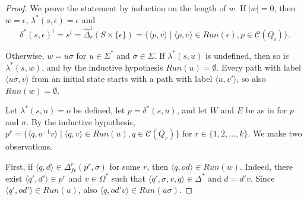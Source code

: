 \begin{proof}
  We prove the statement by induction on the length of $w$. If $|w| = 0$, then $w =
  \epsilon$, $\lambda^*(s, \epsilon) = \epsilon$ and
  \begin{equation*}
    \delta^*(s, \epsilon)^i = s^i = \hat{\Delta}_\epsilon^i(S \times \{ \epsilon \}) =
    \{ \langle p, v \rangle \mid \langle p, v \rangle \in Run(\epsilon), p \in
    \mathcal{C}(Q_i) \}.
  \end{equation*}

  Otherwise, $w = u\sigma$ for $u \in \Sigma^*$ and $\sigma \in \Sigma$. If
  $\lambda^*(s, u)$ is undefined, then so is $\lambda^*(s, w)$, and by the inductive
  hypothesis $Run(u) = \emptyset$. Every path with label $\langle u\sigma, v
  \rangle$ from an initial state starts with a path with label $\langle u, v'
  \rangle$, so also $Run(w) = \emptyset$.

  Let $\lambda^*(s, u) = o$ be defined, let $p = \delta^*(s, u)$, and let $W$ and $E$
  be as in  for $p$ and $\sigma$. By the inductive
  hypothesis, $p^r = \{ \langle q, o^{-1}v \rangle \mid \langle q, v \rangle \in
  Run(u), q \in \mathcal{C}(Q_r) \}$ for $r \in \{ 1, 2, \ldots, k \}$. We make two
  observations.

  First, if $\langle q, d \rangle \in \Delta_{f\epsilon}^r(p^r, \sigma)$ for some $r$,
  then $\langle q, od \rangle \in Run(w)$. Indeed, there exist $\langle q', d' \rangle
  \in p^r$ and $v \in \Omega^*$ such that $\langle q', \sigma, v, q \rangle \in
  \Delta^*$ and $d = d'v$. Since $\langle q', od' \rangle \in Run(u)$, also $\langle
  q, od'v \rangle \in Run(u\sigma)$.


\end{proof}
